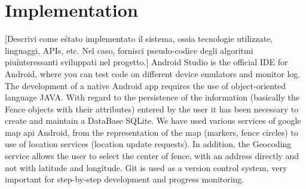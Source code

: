 \documentclass[conference]{IEEEtran}
\begin{document}
\section{Implementation}
[Descrivi come e\' stato implementato il sistema, ossia tecnologie utilizzate, linguaggi, APIs, etc. Nel caso, fornisci pseudo-codice degli algoritmi
piu\' interessanti sviluppati nel progetto.]
Android Studio is the official IDE for Android, where you can test code on different device emulators and monitor log.
The development of a native Android app requires the use of object-oriented language JAVA.
With regard to the persistence of the information (basically the Fence objects with their attributes) entered by the user it has been necessary to create and maintain a DataBase SQLite.
We have used various services of google map api Android, from the representation of the map (markers, fence circles) to use of location services (location update requests).
In addition, the Geocoding service allows the user to select the center of fence, with an address directly and not with latitude and longitude.
Git is used as a version control system, very important for step-by-step development and progress monitoring.
\end{document}

